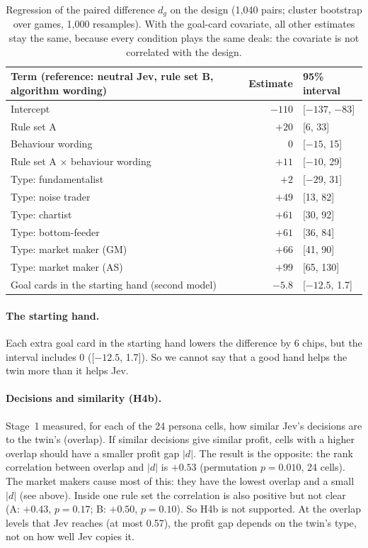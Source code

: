 \begin{table}[t]
\centering\small
\begin{tabular}{lrl}
\toprule
Term (reference: neutral Jev, rule set B, algorithm wording) & Estimate & 95\% interval \\
\midrule
Intercept & $-110$ & [$-137$, $-83$] \\
Rule set A & $+20$ & [6, 33] \\
Behaviour wording & $0$ & [$-15$, 15] \\
Rule set A $\times$ behaviour wording & $+11$ & [$-10$, 29] \\
Type: fundamentalist & $+2$ & [$-29$, 31] \\
Type: noise trader & $+49$ & [13, 82] \\
Type: chartist & $+61$ & [30, 92] \\
Type: bottom-feeder & $+61$ & [36, 84] \\
Type: market maker (GM) & $+66$ & [41, 90] \\
Type: market maker (AS) & $+99$ & [65, 130] \\
\midrule
Goal cards in the starting hand (second model) & $-5.8$ & [$-12.5$, 1.7] \\
\bottomrule
\end{tabular}
\caption{Regression of the paired difference $d_g$ on the design (1,040 pairs; cluster bootstrap over games, 1,000
resamples). With the goal-card covariate, all other estimates stay the same, because every condition plays the same
deals: the covariate is not correlated with the design.}
\label{tab:reg}
\end{table}

\paragraph{The starting hand.} Each extra goal card in the starting hand lowers the difference by 6 chips, but the
interval includes 0 ([$-12.5$, 1.7]). So we cannot say that a good hand helps the twin more than it helps Jev.

\paragraph{Decisions and similarity (H4b).} Stage~1 measured, for each of the 24 persona cells, how similar Jev's
decisions are to the twin's (overlap). If similar decisions give similar profit, cells with a higher overlap should
have a smaller profit gap $|d|$. The result is the opposite: the rank correlation between overlap and $|d|$ is
$+0.53$ (permutation $p = 0.010$, 24 cells). The market makers cause most of this: they have the lowest overlap and a
small $|d|$ (see above). Inside one rule set the correlation is also positive but not clear (A: $+0.43$, $p = 0.17$;
B: $+0.50$, $p = 0.10$). So H4b is not supported. At the overlap levels that Jev reaches (at most 0.57), the profit gap
depends on the twin's type, not on how well Jev copies it.

